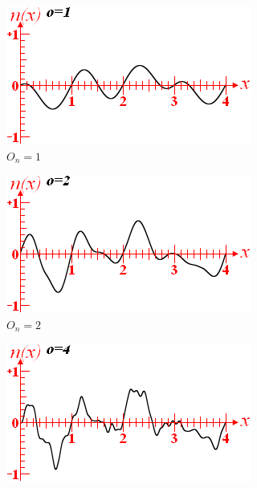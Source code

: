 \documentclass[12pt]{article}
\begin{document}
\begin{figure}[ht]
    \centering
    \begin{subfigure}{0.4\textwidth}
        \centering
        \includegraphics[width=\linewidth]{octave1.png}
        \caption{$O_n=1$}
        \label{fig:octave1}
    \end{subfigure}
    \hfill
    \begin{subfigure}{0.4\textwidth}
        \centering
        \includegraphics[width=\linewidth]{octave2.png}
        \caption{$O_n=2$}
        \label{fig:octave2}
    \end{subfigure}
    \hfill
    \begin{subfigure}{0.4\textwidth}
        \centering
        \includegraphics[width=\linewidth]{octave4.png}

\end{subfigure}
\end{figure}
\end{document}
